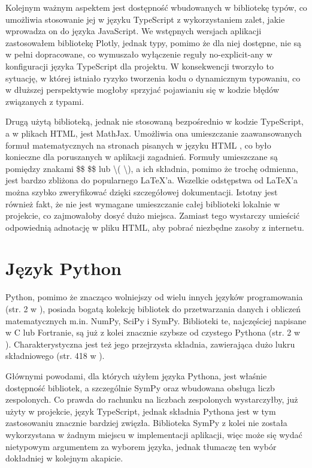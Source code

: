 \documentclass{SGGW-thesis}
\begin{document}
	Kolejnym ważnym aspektem jest dostępność wbudowanych w bibliotekę typów, co umożliwia stosowanie jej w języku TypeScript z wykorzystaniem zalet, jakie wprowadza on do języka JavaScript. We wstępnych wersjach aplikacji zastosowałem bibliotekę Plotly, jednak typy, pomimo że dla niej dostępne, nie są w pełni dopracowane, co wymuszało wyłączenie reguły no-explicit-any w konfiguracji języka TypeScript dla projektu. W konsekwencji tworzyło to sytuację, w której istniało ryzyko tworzenia kodu o dynamicznym typowaniu, co w dłuższej perspektywie mogłoby sprzyjać pojawianiu się w kodzie błędów związanych z typami.
	
	Drugą użytą biblioteką, jednak nie stosowaną bezpośrednio w kodzie TypeScript, a w plikach HTML, jest MathJax. Umożliwia ona umieszczanie zaawansowanych formuł matematycznych na stronach pisanych w języku HTML \cite{mathjax}, co było konieczne dla poruszanych w aplikacji zagadnień. Formuły umieszczane są pomiędzy znakami \$\$ \$\$ lub \textbackslash( \textbackslash), a ich składnia, pomimo że trochę odmienna, jest bardzo zbliżona do popularnego LaTeX'a. Wszelkie odstępstwa od LaTeX'a można szybko zweryfikować dzięki szczegółowej dokumentacji. Istotny jest również fakt, że nie jest wymagane umieszczanie całej biblioteki lokalnie w projekcie, co zajmowałoby dosyć dużo miejsca. Zamiast tego wystarczy umieścić odpowiednią adnotację w pliku HTML, aby pobrać niezbędne zasoby z internetu.
	
	\section{Język Python}
	Python, pomimo że znacząco wolniejszy od wielu innych języków programowania (str. 2 w  \cite{Python}), posiada bogatą kolekcję bibliotek do przetwarzania danych i obliczeń matematycznych m.in. NumPy, SciPy i SymPy. Biblioteki te, najczęściej napisane w C lub Fortranie, są już z kolei znacznie szybsze od czystego Pythona (str. 2 w \cite{Python}). Charakterystyczna jest też jego przejrzysta składnia, zawierająca dużo lukru składniowego (str. 418 w \cite{Python}).
	
	Głównymi powodami, dla których użyłem języka Pythona, jest właśnie dostępność bibliotek, a szczególnie SymPy oraz wbudowana obsługa liczb zespolonych. Co prawda do rachunku na liczbach zespolonych wystarczyłby, już użyty w projekcie, język TypeScript, jednak składnia Pythona jest w tym zastosowaniu znacznie bardziej zwięzła. Biblioteka SymPy z kolei nie została wykorzystana w żadnym miejscu w implementacji aplikacji, więc może się wydać nietypowym argumentem za wyborem języka, jednak tłumaczę ten wybór dokładniej w kolejnym akapicie. 
	
\end{document}
